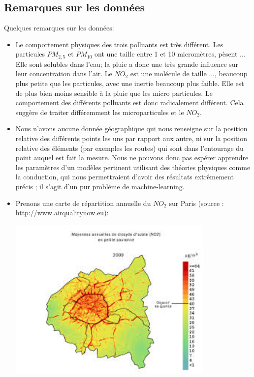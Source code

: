 \subsection{Remarques sur les données}
Quelques remarques sur les données:
\begin{itemize}
  \item
    Le comportement physiques des trois polluants est très différent.
    Les particules $PM_{2,5}$ et $PM_{10}$ ont une taille entre 1 et 10 micromètres, pèsent ...
    Elle sont solubles dans l'eau; la pluie a donc une très grande influence sur leur concentration dans l'air.
    Le $NO_2$ est une molécule de taille ..., beaucoup plus petite que les particules, avec une inertie beaucoup plus faible.
    Elle est de plus bien moins sensible à la pluie que les micro particules.
    Le comportement des différents polluants est donc radicalement différent.
    Cela suggère de traiter différemment les microparticules et le $NO_2$.
  \item
    Nous n'avons aucune donnée géographique qui nous renseigne sur la position relative des différents points les uns par rapport aux autre, ni sur la position relative des éléments (par exemples les routes) qui sont dans l'entourage du point auquel est fait la mesure.
   Nous ne pouvons donc pas espérer apprendre les paramètres d'un modèles pertinent utilisant des théories physiques comme la conduction, qui nous permettraient d'avoir des résultats extrêmement précis ; il s'agit d'un pur problème de machine-learning.
	\item
    	Prenons une carte de répartition annuelle du $NO_2$ sur Paris (source : http://www.airqualitynow.eu):
    \begin{center}
    	\includegraphics[height=8cm]{images/parisno2.jpg}

\end{center}
\end{itemize}
